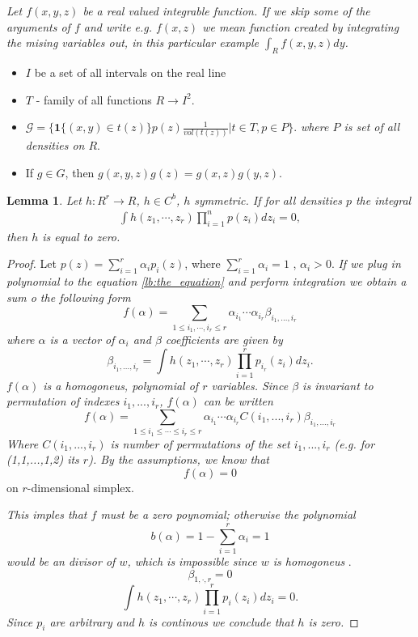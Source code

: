 \documentclass{article}
\newtheorem{lemma}{Lemma}
\begin{document}
\textit{ \color{ForestGreen} 
Let $f(x,y,z)$ be a real valued integrable function. If we skip some of the arguments of $f$ and write e.g. $f(x,z)$ we mean function created by integrating the mising variables out, in this particular example $\int_{R} f(x,y,z) dy$.  
}

\begin{itemize}
 \item $I$ be a set of all intervals on the real line
 \item $T$ - family of all functions $R \to I^2$.
 \item $\mathcal G = \bigg \{ \mathbf{1}\{ (x,y) \in t(z) \}p(z) \frac{1}{vol(t(z))} | t \in T , p \in P  \bigg \}$. \textit{ \color{ForestGreen}  where $P$ is set of all densities on $R$}.
 \item  If $g \in G$, then $g(x,y,z) g(z) = g(x,z) g(y,z)$.
\end{itemize}


\begin{lemma}
\label{the:Lemma}
Let $h: R^r \to R$, $h \in C^b$, $h$ symmetric. If for all densities $p$ the integral 
\begin{align}
\label{lb:the_equation}
\int h(z_1,\cdots,z_r) \prod_{i=1}^n p(z_i) d z_i = 0, 
\end{align}
then $h$ is equal to zero.
\end{lemma}

\begin{proof}
 Let $p(z) = \sum_{i=1}^{r} \alpha_{i} p_i(z)$, where $\sum_{i=1}^r \alpha_i=1$ , $\alpha_i>0$. 
 \textit{ \color{ForestGreen}   If we plug in polynomial to the  equation \ref{lb:the_equation} and perform integration we obtain a sum o the following form}
 \[
  f(\alpha) = \sum_{1 \leq i_1, \cdots , i_r \leq r} \alpha_{i_1} \cdots \alpha_{i_r} \beta_{i_1,...,i_r} 
 \]
\textit{ \color{ForestGreen}  where $\alpha$ is a vector of $\alpha_i$ and $\beta$ coefficients are given by}
 \[
  \beta_{i_1,...,i_r} = \int  h(z_1,\cdots,z_r) \prod_{i=1}^r p_{i_r}(z_i) d z_i.
 \]
\textit{ \color{ForestGreen}  $f(\alpha)$ is a homogoneus, polynomial of $r$ variables. Since $\beta$ is invariant to permutation of indexes $i_1,...,i_r$,
$f(\alpha)$ can be written }
\[
  f(\alpha) = \sum_{1 \leq i_1 \leq  \cdots \leq i_r \leq r} \alpha_{i_1} \cdots \alpha_{i_r}  C(i_1,...,i_r) \beta_{i_1,...,i_r} 
\]
\textit{ \color{ForestGreen}  Where $C(i_1,...,i_r)$ is number of permutations of the set $i_1,...,i_r$ (e.g. for (1,1,...,1,2) its $r$). By the assumptions, we know that } 
\[
f(\alpha) =0 
\] on $r$-dimensional simplex. 

\textit{ \color{ForestGreen}  This imples that $f$ must be a zero poynomial; otherwise the polynomial }
\[
b(\alpha) = 1 -  \sum_{i=1}^r \alpha_i=1
\]
\textit{ \color{ForestGreen}  would be an divisor of $w$, which is impossible since $w$ is homogoneus }. 
$$
\beta_{1,\cdot,r} = 0$$
\[
  \int  h(z_1,\cdots,z_r) \prod_{i=1}^r p_{i}(z_i) d z_i =0.
\]
\textit{ \color{ForestGreen}  Since $p_{i}$ are arbitrary and $h$ is continous we conclude that $h$ is zero.}
\end{proof}
\end{document}
